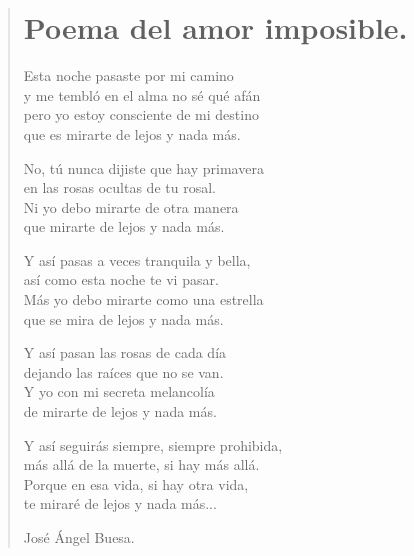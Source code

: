 \documentclass[11pt, portrait, twoside, notitlepage, openright]{book}
\begin{document}
\newpage
\begin{verse}
\begin{center}
\section{Poema del amor imposible.}
\end{center}

Esta noche pasaste por mi camino\\
y me tembló en el alma no sé qué afán\\
pero yo estoy consciente de mi destino\\
que es mirarte de lejos y nada más.
\newline

No, tú nunca dijiste que hay primavera\\
en las rosas ocultas de tu rosal.\\
Ni yo debo mirarte de otra manera\\
que mirarte de lejos y nada más.
\newline

Y así pasas a veces tranquila y bella,\\
así como esta noche te vi pasar.\\
Más yo debo mirarte como una estrella\\
que se mira de lejos y nada más.
\newline

Y así pasan las rosas de cada día\\
dejando las raíces que no se van.\\
Y yo con mi secreta melancolía\\
de mirarte de lejos y nada más.
\newpage

Y así seguirás siempre, siempre prohibida,\\
más allá de la muerte, si hay más allá.\\
Porque en esa vida, si hay otra vida,\\
te miraré de lejos y nada más...
\newline

José Ángel Buesa.
\end{verse}
\end{document}
